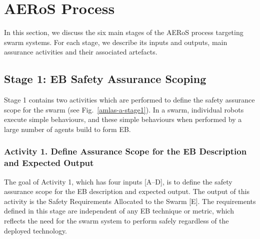 \documentclass[runningheads]{llncs}
\begin{document}
\section{AERoS Process}\label{framework}
In this section, we discuss the six main stages of the AERoS process targeting swarm systems. For each stage, we describe its inputs and outputs, main assurance activities and their associated artefacts.
%

\subsection{Stage 1: EB Safety Assurance Scoping} \label{framework-stage1}
Stage 1 contains two activities which are performed to define the safety assurance scope for the swarm (see Fig.~\ref{amlas-a-stage1}). In a swarm, individual robots execute simple behaviours, and these simple behaviours when performed by a large number of agents build to form EB.  
\subsubsection*{Activity 1. Define Assurance Scope for the EB Description and Expected Output}
The goal of Activity 1, which has four inputs [A--D], is to define the safety assurance scope for the EB description and expected output. 
The output of this activity is the Safety Requirements Allocated to the Swarm [E]. The requirements defined in this stage are independent of any EB technique or metric, which reflects the need for the swarm system to perform safely regardless of the deployed technology. 
\end{document}
